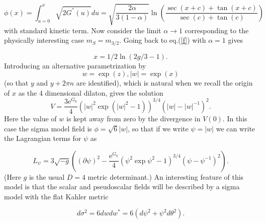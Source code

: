 \documentclass[a4paper,12pt]{article}
\begin{document}
\begin{equation}\label{phi}
    \phi(x) = \int_{u=0}^{x}\sqrt{2G^{''}(u)}du =
    \sqrt{\frac{2\alpha}{3(1-\alpha)}}\ln{(\frac{\sec(x+c)+\tan(x+c)}{\sec(c)+ \tan(c)})}
\end{equation}
with standard kinetic term. Now consider the limit $\alpha
\rightarrow 1$ corresponding to the physically interesting case
$m_{S} = m_{3/2}$. Going back to eq.(\ref{f}) with $\alpha = 1$
gives

\begin{equation}\label{L}
   x = 1/2 \ln{(2g/3 - 1)}.
\end{equation}
Introducing an alternative parametrization by
\begin{equation}\label{w}
    w = \exp{(z)}, |w| = \exp{(x)}
\end{equation}
(so that $y$ and $y + 2\pi n$ are identified), which is natural
when we recall the origin of $x$ as the 4 dimensional dilaton,
gives the solution
\begin{equation}\label{SL}
    V = \frac{3 \mathrm{e}^{G_{0}}}{4}(|w|^{2} \exp{(|w|^{2}-1)})^{3/4}(|w| -
    |w|^{-1})^{2}.
\end{equation}
Here the value of $w$ is kept away from zero by the divergence in
$V(0)$. In this case the sigma model field is $\phi =
\sqrt{6}|w|$, so that if we write $\psi = |w|$ we can write the
Lagrangian terms for $\psi$ as

\begin{equation}\label{psi}
    L_{\psi} = 3\sqrt{-g}((\partial \psi)^{2} - \frac{\mathrm{e}^{G_{0}}}{4}
    (\psi^{2}\exp{\psi^{2}-1})^{3/4}(\psi - \psi^{-1})^{2}).
\end{equation}
(Here $g$ is the usual $D=4$ metric determinant.) An interesting
feature of this model is that the scalar and pseudoscalar fields
will be described by a sigma model with the flat Kahler metric

\begin{equation}\label{sig}
    d \sigma^{2} = 6dwdw^{*} = 6(d\psi^{2} + \psi^{2}d\theta^{2}).
\end{equation}
\end{document}
